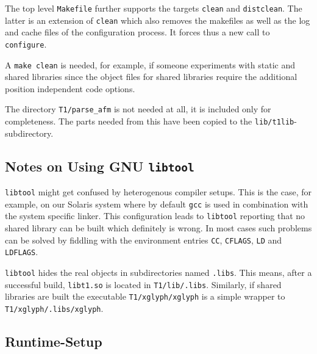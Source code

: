 The top level \verb+Makefile+ further supports the targets \verb+clean+ and
\verb+distclean+. The latter is an extension of \verb+clean+ which also
removes the makefiles as well as the log and cache files of the configuration
process. It forces thus a new call to \verb+configure+. 

A \verb+make clean+ is needed, for example, if someone experiments with static
and shared libraries since the object files for shared libraries require the
additional position independent code options.

The directory \verb+T1/parse_afm+ is not needed at all, it is included only
for completeness. The parts needed from this have been copied to the
\verb+lib/t1lib+-subdirectory. 


\subsection{Notes on Using GNU {\tt libtool}}
\label{libtoolproblems}%
\verb+libtool+ might get confused by heterogenous compiler setups. This is the
case, for example, on our Solaris system where by default \verb+gcc+ is used
in combination with the system specific linker. This configuration leads to
\verb+libtool+ reporting that no shared library can be built which definitely
is wrong. In most cases such problems can be solved by fiddling with the
environment entries \verb+CC+, \verb+CFLAGS+, \verb+LD+ and \verb+LDFLAGS+.

\verb+libtool+ hides the real objects in subdirectories named \verb+.libs+.
This means, after a successful build, \verb+libt1.so+ is located in
\verb+T1/lib/.libs+. Similarly, if shared libraries are built the executable
\verb+T1/xglyph/xglyph+ is a simple wrapper to \verb+T1/xglyph/.libs/xglyph+. 


\subsection{Runtime-Setup}
\label{runtimesetup}%
